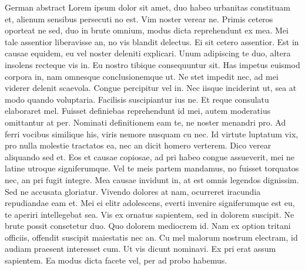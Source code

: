 \noindent German abstract Lorem ipsum dolor sit amet, duo habeo urbanitas constituam et, alienum sensibus persecuti no est. Vim noster verear ne. Primis ceteros oporteat ne sed, duo in brute omnium, modus dicta reprehendunt ex mea. Mei tale assentior liberavisse an, no vis blandit delectus. Ei sit cetero assentior. Est in causae equidem, eu vel noster deleniti explicari. Unum adipiscing te duo, altera insolens recteque vis in. Eu nostro tibique consequuntur sit. Has impetus euismod corpora in, nam omnesque conclusionemque ut. Ne stet impedit nec, ad mei viderer delenit scaevola. Congue percipitur vel in. Nec iisque inciderint ut, sea at modo quando voluptaria. Facilisis suscipiantur ius ne. Et reque consulatu elaboraret mel. Fuisset definiebas reprehendunt id mei, autem moderatius omittantur at per. Nominati definitionem eam te, ne noster menandri pro. Ad ferri vocibus similique his, viris nemore nusquam cu nec. Id virtute luptatum vix, pro nulla molestie tractatos ea, nec an dicit homero verterem. Dico verear aliquando sed et. Eos et causae copiosae, ad pri habeo congue assueverit, mei ne latine utroque signiferumque. Vel te meis partem mandamus, no fuisset torquatos nec, an pri fugit integre. Mea causae invidunt in, at est omnis legendos dignissim. Sed ne accusata gloriatur. Vivendo dolores at nam, ocurreret iracundia repudiandae eam et. Mei ei elitr adolescens, everti invenire signiferumque est eu, te aperiri intellegebat sea. Vis ex ornatus sapientem, sed in dolorem suscipit. Ne brute possit consetetur duo. Quo dolorem mediocrem id. Nam ex option tritani officiis, offendit suscipit maiestatis nec an. Cu mel malorum nostrum electram, id audiam praesent interesset cum. Ut vis dicunt nominavi. Ex pri erat assum sapientem. Ea modus dicta facete vel, per ad probo habemus.

